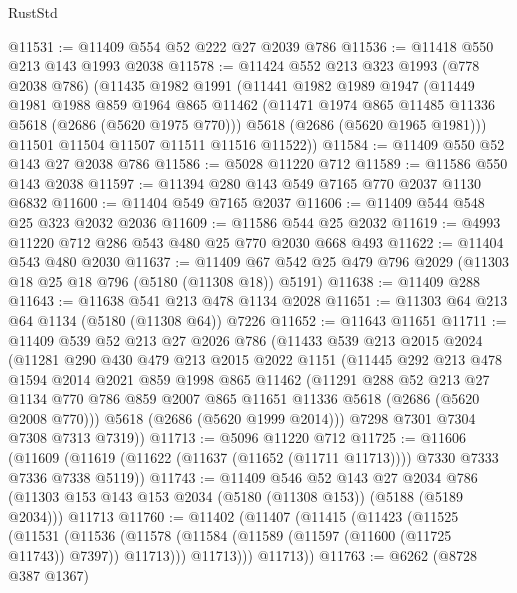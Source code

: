 \begin{lexlean}{RustStd}
\begin{coremodule}
@11531 := @11409 @554 @52 @222 @27 @2039 @786
@11536 := @11418 @550 @213 @143 @1993 @2038
@11578 := @11424
    @552
    @213
    @323
    @1993
    (@778 @2038 @786)
    (@11435
      @1982
      @1991
      (@11441
        @1982
        @1989
        @1947
        (@11449
          @1981
          @1988
          @859
          @1964
          @865
          @11462
          (@11471 @1974 @865 @11485 @11336 @5618 (@2686 (@5620 @1975 @770)))
          @5618
          (@2686 (@5620 @1965 @1981)))
        @11501
        @11504
        @11507
        @11511
        @11516
        @11522))
@11584 := @11409 @550 @52 @143 @27 @2038 @786
@11586 := @5028 @11220 @712
@11589 := @11586 @550 @143 @2038
@11597 := @11394 @280 @143 @549 @7165 @770 @2037 @1130 @6832
@11600 := @11404 @549 @7165 @2037
@11606 := @11409 @544 @548 @25 @323 @2032 @2036
@11609 := @11586 @544 @25 @2032
@11619 := @4993 @11220 @712 @286 @543 @480 @25 @770 @2030 @668 @493
@11622 := @11404 @543 @480 @2030
@11637 := @11409 @67 @542 @25 @479 @796 @2029 (@11303 @18 @25 @18 @796 (@5180 (@11308 @18)) @5191)
@11638 := @11409 @288
@11643 := @11638 @541 @213 @478 @1134 @2028
@11651 := @11303 @64 @213 @64 @1134 (@5180 (@11308 @64)) @7226
@11652 := @11643 @11651
@11711 := @11409
    @539
    @52
    @213
    @27
    @2026
    @786
    (@11433
      @539
      @213
      @2015
      @2024
      (@11281
        @290
        @430
        @479
        @213
        @2015
        @2022
        @1151
        (@11445
          @292
          @213
          @478
          @1594
          @2014
          @2021
          @859
          @1998
          @865
          @11462
          (@11291
            @288
            @52
            @213
            @27
            @1134
            @770
            @786
            @859
            @2007
            @865
            @11651
            @11336
            @5618
            (@2686 (@5620 @2008 @770)))
          @5618
          (@2686 (@5620 @1999 @2014)))
        @7298
        @7301
        @7304
        @7308
        @7313
        @7319))
@11713 := @5096 @11220 @712
@11725 := @11606
    (@11609 (@11619 (@11622 (@11637 (@11652 (@11711 @11713)))) @7330 @7333 @7336 @7338 @5119))
@11743 := @11409
    @546
    @52
    @143
    @27
    @2034
    @786
    (@11303 @153 @143 @153 @2034 (@5180 (@11308 @153)) (@5188 (@5189 @2034)))
    @11713
@11760 := @11402
    (@11407
      (@11415
        (@11423
          (@11525
            (@11531
              (@11536 (@11578 (@11584 (@11589 (@11597 (@11600 (@11725 @11743)) @7397)) @11713)))
              @11713)))
        @11713))
@11763 := @6262 (@8728 @387 @1367)

\end{coremodule}
\end{lexlean}
